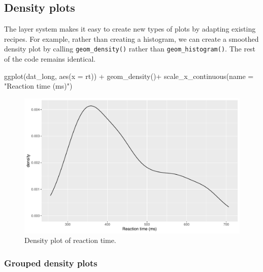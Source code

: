 \documentclass[
  english,
  doc,floatsintext]{apa6}
\newenvironment{Shaded}{\begin{snugshade}}{\end{snugshade}}
\newcommand{\AttributeTok}[1]{\textcolor[rgb]{0.77,0.63,0.00}{#1}}
\newcommand{\FunctionTok}[1]{\textcolor[rgb]{0.00,0.00,0.00}{#1}}
\newcommand{\NormalTok}[1]{#1}
\newcommand{\SpecialCharTok}[1]{\textcolor[rgb]{0.00,0.00,0.00}{#1}}
\newcommand{\StringTok}[1]{\textcolor[rgb]{0.31,0.60,0.02}{#1}}
\begin{document}
\hypertarget{density-plots}{%
\subsection{Density plots}\label{density-plots}}

The layer system makes it easy to create new types of plots by adapting existing recipes. For example, rather than creating a histogram, we can create a smoothed density plot by calling \texttt{geom\_density()} rather than \texttt{geom\_histogram()}. The rest of the code remains identical.

\begin{Shaded}
\begin{Highlighting}[]
\FunctionTok{ggplot}\NormalTok{(dat\_long, }\FunctionTok{aes}\NormalTok{(}\AttributeTok{x =}\NormalTok{ rt)) }\SpecialCharTok{+}
  \FunctionTok{geom\_density}\NormalTok{()}\SpecialCharTok{+}
  \FunctionTok{scale\_x\_continuous}\NormalTok{(}\AttributeTok{name =} \StringTok{"Reaction time (ms)"}\NormalTok{)}
\end{Highlighting}
\end{Shaded}

\begin{figure}

{\centering \includegraphics[width=1\linewidth]{images/density-rt-1} 

}

\caption{Density plot of reaction time.}\label{fig:density-rt}
\end{figure}

\hypertarget{grouped-density-plots}{%
\subsubsection{Grouped density plots}\label{grouped-density-plots}}
\end{document}
